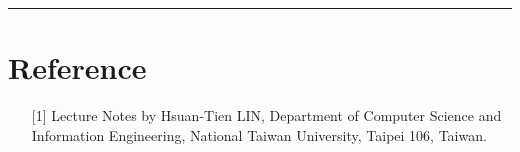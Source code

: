 \documentclass[12pt]{article}
\newcommand{\horrule}[1]{\rule{\linewidth}{#1}}
\begin{document}
\horrule{0.5pt}

\section*{Reference}

\begin{enumerate}

\item[{[1]}] Lecture Notes by Hsuan-Tien LIN, Department of Computer Science and Information Engineering, National Taiwan University, Taipei 106, Taiwan.


\end{enumerate}
\end{document}
